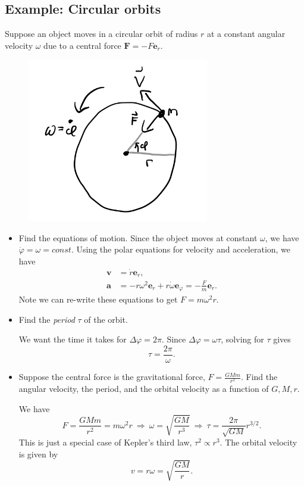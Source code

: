 \documentclass[
  letterpaper,
  DIV=11,
  numbers=noendperiod]{scrreprt}
\begin{document}
\hypertarget{example-circular-orbits}{%
\subsection{Example: Circular orbits}\label{example-circular-orbits}}

Suppose an object moves in a circular orbit of radius \(r\) at a
constant angular velocity \(\omega\) due to a central force
\(\mathbf{F} = -F\mathbf{e}_r\).

\begin{figure}

{\centering \includegraphics[width=3.125in,height=\textheight]{classical-mechanics/./resources/image-20230212033719862.png}

}

\end{figure}

\begin{itemize}
\item
  Find the equations of motion. Since the object moves at constant
  \(\omega\), we have \(\dot \varphi = \omega = const\). Using the polar
  equations for velocity and acceleration, we have \[
  \begin{align*}
  \mathbf{v} &= \dot r \mathbf{e}_r, \\
  \mathbf{a} &= -r\omega^2\mathbf{e}_r + r \dot \omega\mathbf{e}_\varphi = - \frac{F}{m}\mathbf{e}_r.
  \end{align*}
  \] Note we can re-write these equations to get \(F = m\omega^2 r\).
\item
  Find the \emph{period} \(\tau\) of the orbit.

  We want the time it takes for \(\Delta \varphi = 2\pi\). Since
  \(\Delta \varphi = \omega\tau\), solving for \(\tau\) gives
  \[\tau = \frac{2\pi}{\omega}.\]
\item
  Suppose the central force is the gravitational force,
  \(F = \frac{GMm}{r^2}\). Find the angular velocity, the period, and
  the orbital velocity as a function of \(G, M, r\).

  We have \[
  F = \frac{GMm}{r^2} = m\omega^2 r \ \Longrightarrow \ \omega = \sqrt{\frac{GM}{r^3}} \ \Longrightarrow \ \tau = \frac{2\pi}{\sqrt{GM}} r^{3/2}.
  \] This is just a special case of Kepler's third law,
  \(\tau^2 \propto r^3\). The orbital velocity is given by \[
  v = r\omega = \sqrt{\frac{GM}{r}}.
  \]
\end{itemize}
\end{document}

